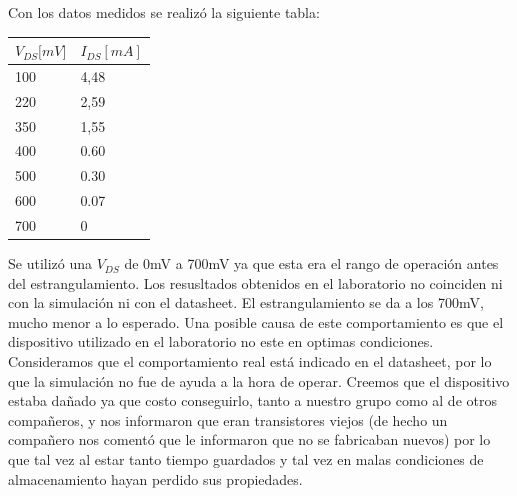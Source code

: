 \sangria{} Con los datos medidos se realizó la siguiente tabla:
\begin{center}\begin{tabular}{|l|l|}
\hline
\rowcolor[HTML]{FFFFC7} 
\textbf{$V_{DS}{[}mV{]}$} & \cellcolor[HTML]{FFFC9E}\textbf{$I_{DS}[mA]$} \\ \hline
100                           & 4,48                                             \\ \hline
220                       & 2,59                                          \\ \hline
350                           & 1,55                                          \\ \hline
400                       & 0.60                                          \\ \hline
500                        & 0.30                                          \\ \hline
600                           & 0.07                                          \\ \hline
700                           & 0                                           \\ \hline
\end{tabular}\end{center}
\sangria{} Se utilizó una $V_{DS}$ de 0mV a 700mV ya que esta era el rango de operación antes del estrangulamiento.
\sangria{} Los resusltados obtenidos en el laboratorio no coinciden ni con la simulación ni con el datasheet. El estrangulamiento se da a los 700mV, mucho menor a lo esperado. Una posible causa de este comportamiento es que el dispositivo utilizado en el laboratorio no este en optimas condiciones. Consideramos que el comportamiento real está indicado en el datasheet, por lo que la simulación no fue de ayuda a la hora de operar.
\sangria{} Creemos que el dispositivo estaba dañado ya que costo conseguirlo, tanto a nuestro grupo como al de otros compañeros, y nos informaron que eran transistores viejos (de hecho un compañero nos comentó que le informaron que no se fabricaban nuevos) por lo que tal vez al estar tanto tiempo guardados y tal vez en malas condiciones de almacenamiento hayan perdido sus propiedades.

